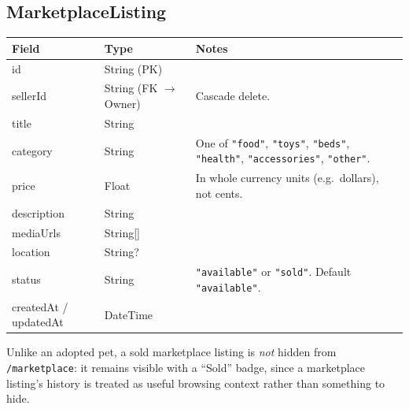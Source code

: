 \documentclass[11pt,a4paper]{article}
\makeatletter
\newcommand{\modeltable}[1]{%
  \begin{tabular}{@{}p{3.3cm}p{2.6cm}p{8.3cm}@{}}
  \toprule
  \textbf{Field} & \textbf{Type} & \textbf{Notes} \\
  \midrule
  #1
  \bottomrule
  \end{tabular}
}
\makeatother
\begin{document}
\subsection{MarketplaceListing}
\modeltable{
id & String (PK) & \\
sellerId & String (FK $\to$ Owner) & Cascade delete. \\
title & String & \\
category & String & One of \texttt{"food"}, \texttt{"toys"}, \texttt{"beds"},
  \texttt{"health"}, \texttt{"accessories"}, \texttt{"other"}. \\
price & Float & In whole currency units (e.g.\ dollars), not cents. \\
description & String & \\
mediaUrls & String[] & \\
location & String? & \\
status & String & \texttt{"available"} or \texttt{"sold"}. Default
  \texttt{"available"}. \\
createdAt / updatedAt & DateTime & \\
}
Unlike an adopted pet, a sold marketplace listing is \emph{not} hidden from
\texttt{/marketplace}: it remains visible with a ``Sold'' badge, since a marketplace
listing's history is treated as useful browsing context rather than something to hide.
\end{document}
